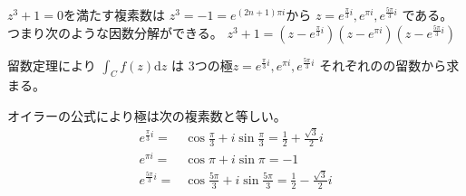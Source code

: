 \documentclass[12pt,b5paper]{ltjsarticle}
\begin{document}
$z^3+1=0$を満たす複素数は
$z^3=-1=e^{(2n+1)\pi i}$から
$z=e^{\frac{\pi}{3}i},e^{\pi i},e^{\frac{5\pi}{3}i}$
である。
つまり次のような因数分解ができる。
$z^3+1 = (z-e^{\frac{\pi}{3}i})(z-e^{\pi i})(z-e^{\frac{5\pi}{3}i})$

留数定理により
$\int_{C} f(z)\mathrm{d}z$
は
3つの極$z=e^{\frac{\pi}{3}i},e^{\pi i},e^{\frac{5\pi}{3}i}$
それぞれのの留数から求まる。

オイラーの公式により極は次の複素数と等しい。
\begin{align}
 e^{\frac{\pi}{3}i} =& \cos{\frac{\pi}{3}}+i\sin{\frac{\pi}{3}}
  = \frac{1}{2}+\frac{\sqrt{3}}{2}i\\
 e^{\pi i} =& \cos{\pi}+i\sin{\pi}
  = -1\\
 e^{\frac{5\pi}{3}i} =& \cos{\frac{5\pi}{3}}+i\sin{\frac{5\pi}{3}}
  = \frac{1}{2}-\frac{\sqrt{3}}{2}i
\end{align}
\end{document}
